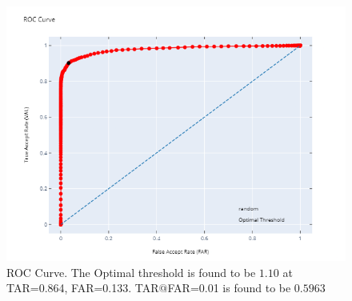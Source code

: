 \documentclass[
12pt,
tightenlines,
aps,
prb,
twocolumn,
superscriptaddress,
longbibliography,
floatfix
]{revtex4-2}
\begin{document}
\begin{figure}[h]
    \includegraphics[clip=true,width=\columnwidth]{roc.png}
    \caption{ROC Curve. The Optimal threshold is found to be $1.10$ at TAR=0.864, FAR=0.133. TAR$@$FAR=0.01 is found to be $0.5963$} 
     \label{fig:roclfw}
\end{figure}




\end{document}

